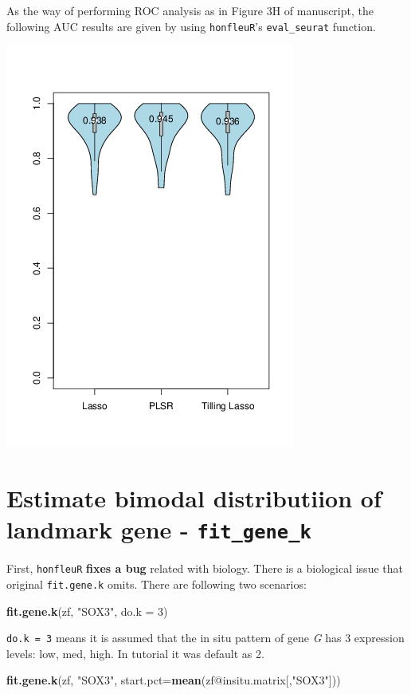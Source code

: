 \documentclass[]{article}
\newenvironment{Shaded}{\begin{snugshade}}{\end{snugshade}}
\newcommand{\KeywordTok}[1]{\textcolor[rgb]{0.13,0.29,0.53}{\textbf{{#1}}}}
\newcommand{\DataTypeTok}[1]{\textcolor[rgb]{0.13,0.29,0.53}{{#1}}}
\newcommand{\DecValTok}[1]{\textcolor[rgb]{0.00,0.00,0.81}{{#1}}}
\newcommand{\StringTok}[1]{\textcolor[rgb]{0.31,0.60,0.02}{{#1}}}
\newcommand{\NormalTok}[1]{{#1}}
\begin{document}
As the way of performing ROC analysis as in Figure 3H of manuscript, the
following AUC results are given by using \texttt{honfleuR}'s
\texttt{eval\_seurat} function.

\includegraphics[width=0.5\linewidth]{imputation_schemes.png}

\section{\texorpdfstring{Estimate bimodal distributiion of landmark gene
-
\texttt{fit\_gene\_k}}{Estimate bimodal distributiion of landmark gene - fit\_gene\_k}}\label{estimate-bimodal-distributiion-of-landmark-gene---fitux5fgeneux5fk}

First, \texttt{honfleuR} \textbf{fixes a bug} related with biology.
There is a biological issue that original \texttt{fit.gene.k} omits.
There are following two scenarios:

\begin{Shaded}
\begin{Highlighting}[]
\KeywordTok{fit.gene.k}\NormalTok{(zf, }\StringTok{"SOX3"}\NormalTok{, }\DataTypeTok{do.k =} \DecValTok{3}\NormalTok{)}
\end{Highlighting}
\end{Shaded}

\texttt{do.k\ =\ 3} means it is assumed that the in situ pattern of gene
\emph{G} has 3 expression levels: low, med, high. In tutorial it was
default as 2.

\begin{Shaded}
\begin{Highlighting}[]
\KeywordTok{fit.gene.k}\NormalTok{(zf, }\StringTok{"SOX3"}\NormalTok{, }\DataTypeTok{start.pct=}\KeywordTok{mean}\NormalTok{(zf@insitu.matrix[,}\StringTok{"SOX3"}\NormalTok{]))}
\end{Highlighting}
\end{Shaded}
\end{document}
